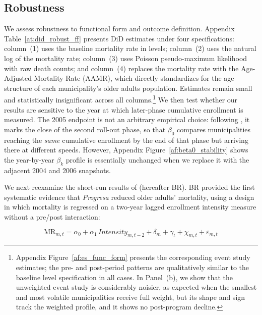 \documentclass[12pt]{article}
\begin{document}
\subsection{Robustness}\label{s:robustness}

\p We assess robustness to functional form and outcome definition. Appendix Table~\ref{at:did_robust_ff} presents DiD estimates under four specifications: column~(1) uses the baseline mortality rate in levels; column~(2) uses the natural log of the mortality rate; column~(3) uses Poisson pseudo-maximum likelihood with raw death counts; and column~(4) replaces the mortality rate with the Age-Adjusted Mortality Rate (AAMR), which directly standardizes for the age structure of each municipality's older adults population. Estimates remain small and statistically insignificant across all columns.\footnote{Appendix Figure~\ref{af:es_func_form} presents the corresponding event study estimates; the pre- and post-period patterns are qualitatively similar to the baseline level specification in all cases. In Panel~(b), we show that the unweighted event study is considerably noisier, as expected when the smallest and most volatile municipalities receive full weight, but its shape and sign track the weighted profile, and it shows no post-program decline.} We then test whether our results are sensitive to the year at which later-phase cumulative enrollment is measured. The 2005 endpoint is not an arbitrary empirical choice: following \cite{parker2023conditional}, it marks the close of the second roll-out phase, so that $\beta_0$ compares municipalities reaching the \textit{same} cumulative enrollment by the end of that phase but arriving there at different speeds. However, Appendix Figure~\ref{af:beta0_stability} shows the year-by-year $\beta_k$ profile is essentially unchanged when we replace it with the adjacent 2004 and 2006 snapshots.

\p We next reexamine the short-run results of \cite{BarhamRowberry2013JDE} (hereafter BR). BR provided the first systematic evidence that \textit{Progresa} reduced older adults' mortality, using a design in which mortality is regressed on a two-year lagged enrollment intensity measure without a pre/post interaction:

\begin{equation}\label{eq:br}
\text{MR}_{m,t}
= \alpha_{0} + \alpha_{1}\,\textit{Intensity}_{m,t-2}
+ \delta_{m} + \gamma_{t} + \chi_{m,t} + \varepsilon_{m,t}
\end{equation}
\end{document}
